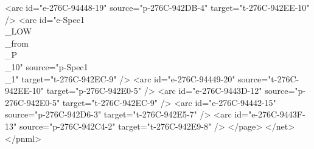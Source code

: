    <arc id="e-276C-94448-19" source="p-276C-942DB-4" target="t-276C-942EE-10" />
   <arc id="e-Spec1\\_LOW\\_from\\_P\\_10" source="p-Spec1\\_1" target="t-276C-942EC-9" />
   <arc id="e-276C-94449-20" source="t-276C-942EE-10" target="p-276C-942E0-5" />
   <arc id="e-276C-9443D-12" source="p-276C-942E0-5" target="t-276C-942EC-9" />
   <arc id="e-276C-94442-15" source="p-276C-942D6-3" target="t-276C-942E5-7" />
   <arc id="e-276C-9443F-13" source="p-276C-942C4-2" target="t-276C-942E9-8" />
  </page>
 </net>
</pnml>
